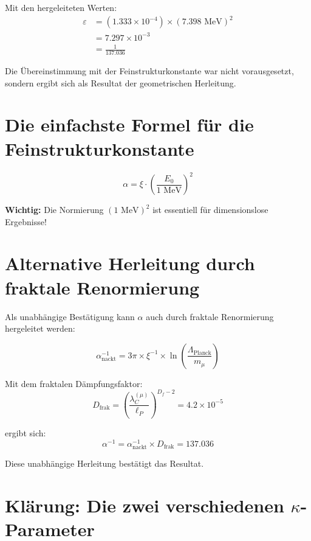 	Mit den hergeleiteten Werten:
	\begin{align}
		\varepsilon &= (1.333 \times 10^{-4}) \times (7.398 \text{ MeV})^2\\
		&= 7.297 \times 10^{-3}\\
		&= \frac{1}{137.036}
	\end{align}
	
	Die Übereinstimmung mit der Feinstrukturkonstante war nicht vorausgesetzt, sondern ergibt sich als Resultat der geometrischen Herleitung.
	\section*{Die einfachste Formel für die Feinstrukturkonstante}

\[
\boxed{\alpha = \xi \cdot \left(\frac{E_0}{1 \text{ MeV}}\right)^2}
\]
\begin{tcolorbox}[colback=red!5!white,colframe=red!75!black]
	\textbf{Wichtig:} Die Normierung $(1 \text{ MeV})^2$ ist essentiell für dimensionslose Ergebnisse!
\end{tcolorbox}	
	\section{Alternative Herleitung durch fraktale Renormierung}
	
	Als unabhängige Bestätigung kann $\alpha$ auch durch fraktale Renormierung hergeleitet werden:
	
	\begin{equation}
		\alpha_{\text{nackt}}^{-1} = 3\pi \times \xi^{-1} \times \ln\left(\frac{\Lambda_{\text{Planck}}}{m_\mu}\right)
	\end{equation}
	
	Mit dem fraktalen Dämpfungsfaktor:
	\begin{equation}
		D_{\text{frak}} = \left(\frac{\lambda_C^{(\mu)}}{\ell_P}\right)^{D_f-2} = 4.2 \times 10^{-5}
	\end{equation}
	
	ergibt sich:
	\begin{equation}
		\alpha^{-1} = \alpha_{\text{nackt}}^{-1} \times D_{\text{frak}} = 137.036
	\end{equation}
	
	Diese unabhängige Herleitung bestätigt das Resultat.
	
	\section{Klärung: Die zwei verschiedenen $\kappa$-Parameter}
	
